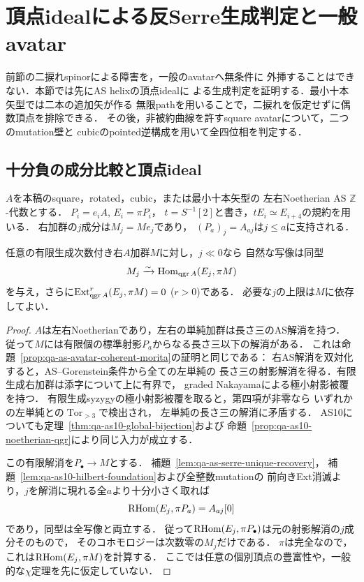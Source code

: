 \section{頂点idealによる反Serre生成判定と一般avatar}
\label{sec:qa-general-vertex-az}

前節の二捩れspinorによる障害を，一般のavatarへ無条件に
外挿することはできない．本節では先にAS helixの頂点idealに
よる生成判定を証明する．最小十本矢型では二本の追加矢が作る
無限pathを用いることで，二捩れを仮定せずに偶数頂点を排除できる．
その後，非被約曲線を許すsquare avatarについて，二つのmutation壁と
cubicのpointed逆構成を用いて全四位相を判定する．

\subsection{十分負の成分比較と頂点ideal}

$A$を本稿のsquare，rotated，cubic，または最小十本矢型の
左右Noetherian AS $\mathbb Z$-代数とする．
$P_i=e_iA$, $E_i=\pi P_i$，
$t=S^{-1}[2]$と書き，$tE_i\simeq E_{i+4}$の規約を用いる．
右加群の$j$成分は$M_j=Me_j$であり，
$(P_a)_j=A_{aj}$は$j\le a$に支持される．

\begin{lemma}[有限射影解消からの遠方成分比較]
\label{lem:qa-as-far-component-comparison}
任意の有限生成次数付き右$A$加群$M$に対し，$j\ll0$なら
自然な写像は同型
\[
 M_j\xrightarrow{\sim}\operatorname{Hom}_{\operatorname{qgr} A}(E_j,\pi M)
\]
を与え，さらに$\operatorname{Ext}^r_{\operatorname{qgr} A}(E_j,\pi M)=0$ ($r>0$)である．
必要な$j$の上限は$M$に依存してよい．
\end{lemma}
\begin{proof}
$A$は左右Noetherianであり，左右の単純加群は長さ三のAS解消を持つ．
従って$M$には有限個の標準射影$P_a$からなる長さ三以下の解消がある．
これは命題~\ref{prop:qa-as-avatar-coherent-morita}の証明と同じである：
右AS解消を双対化すると，AS--Gorenstein条件から全ての左単純の
長さ三の射影解消を得る．有限生成右加群は添字について上に有界で，
graded Nakayamaによる極小射影被覆を持つ．
有限生成syzygyの極小射影被覆を取ると，第四項が非零なら
いずれかの左単純との$\operatorname{Tor}_{>3}$で検出され，
左単純の長さ三の解消に矛盾する．
AS10についても定理~\ref{thm:qa-as10-global-bijection}および
命題~\ref{prop:qa-as10-noetherian-qgr}により同じ入力が成立する．

この有限解消を$P_\bullet\to M$とする．
補題~\ref{lem:qa-as-serre-unique-recovery}，
補題~\ref{lem:qa-as10-hilbert-foundation}および全整数mutationの
前向きExt消滅より，$j$を解消に現れる全$a$より十分小さく取れば
\[
 \operatorname{RHom}(E_j,\pi P_a)=A_{aj}[0]
\]
であり，同型は全写像と両立する．
従って$\operatorname{RHom}(E_j,\pi P_\bullet)$は元の射影解消の$j$成分そのもので，
そのコホモロジーは次数零の$M_j$だけである．
$\pi$は完全なので，これは$\operatorname{RHom}(E_j,\pi M)$を計算する．
ここでは任意の個別頂点の豊富性や，一般的な$\chi$定理を先に仮定していない．
\end{proof}

